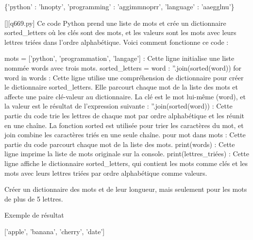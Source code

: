 \{'python' : 'hnopty', 'programming' : 'aggimmnoprr', 'language' : 'aaegglnu'\}
        \par
        \begin{solution}
            \renewcommand{\nomfichier}{q669.py}
            \pythonfile{\chemincode \nomfichier}[][\nomfichier]
            Ce code Python prend une liste de mots et crée un dictionnaire sorted_letters où les clés sont des mots, et les valeurs sont les mots avec leurs lettres triées dans l'ordre alphabétique. Voici comment fonctionne ce code :

    mots = ['python', 'programmation', 'langage'] : Cette ligne initialise une liste nommée words avec trois mots.
    sorted_letters = {word : ''.join(sorted(word)) for word in words} : Cette ligne utilise une compréhension de dictionnaire pour créer le dictionnaire sorted_letters. Elle parcourt chaque mot de la liste des mots et affecte une paire clé-valeur au dictionnaire. La clé est le mot lui-même (word), et la valeur est le résultat de l'expression suivante :
        ''.join(sorted(word)) : Cette partie du code trie les lettres de chaque mot par ordre alphabétique et les réunit en une chaîne. La fonction sorted est utilisée pour trier les caractères du mot, et join combine les caractères triés en une seule chaîne.
        pour mot dans mots : Cette partie du code parcourt chaque mot de la liste des mots.
    print(words) : Cette ligne imprime la liste de mots originale sur la console.
    print(lettres_triées) : Cette ligne affiche le dictionnaire sorted_letters, qui contient les mots comme clés et les mots avec leurs lettres triées par ordre alphabétique comme valeurs.
        \end{solution}
        

        \question
        Créer un dictionnaire des mots et de leur longueur, mais seulement pour les mots de plus de 5 lettres.

Exemple de résultat

['apple', 'banana', 'cherry', 'date']

